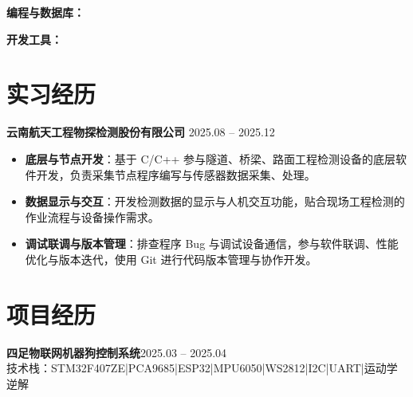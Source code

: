 \documentclass[10pt,a4paper]{article}
\newcommand{\projectblock}[3]{%
    {\bfseries\color{darktext}#1}\hfill{\color{graytext}#2}\\%
    {\small\color{graytext}#3}%
    \vspace{0.2em}%
}
\begin{document}
{\bfseries\color{primary}编程与数据库：}

\vspace{2pt}

{\bfseries\color{primary}开发工具：}

\section{\faBriefcase\hspace{0.4em}实习经历}

{\bfseries 云南航天工程物探检测股份有限公司}\hfill{\color{graytext} 2025.08 -- 2025.12}

\vspace{2pt}

\begin{itemize}[leftmargin=1.5em, itemsep=2pt, parsep=0pt, topsep=2pt]
    \item \textbf{底层与节点开发}：基于 C/C++ 参与隧道、桥梁、路面工程检测设备的底层软件开发，负责采集节点程序编写与传感器数据采集、处理。
    \item \textbf{数据显示与交互}：开发检测数据的显示与人机交互功能，贴合现场工程检测的作业流程与设备操作需求。
    \item \textbf{调试联调与版本管理}：排查程序 Bug 与调试设备通信，参与软件联调、性能优化与版本迭代，使用 Git 进行代码版本管理与协作开发。
\end{itemize}

\vspace{0.15em}

\section{\faProjectDiagram\hspace{0.4em}项目经历}

\projectblock{四足物联网机器狗控制系统}{2025.03 -- 2025.04}{技术栈：STM32F407ZE\hspace{0.3em}|\hspace{0.3em}PCA9685\hspace{0.3em}|\hspace{0.3em}ESP32\hspace{0.3em}|\hspace{0.3em}MPU6050\hspace{0.3em}|\hspace{0.3em}WS2812\hspace{0.3em}|\hspace{0.3em}I2C\hspace{0.3em}|\hspace{0.3em}UART\hspace{0.3em}|\hspace{0.3em}运动学逆解}
\end{document}
